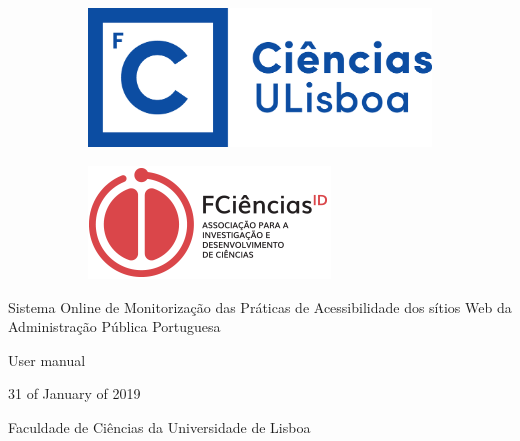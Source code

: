 \pagestyle{empty}

\begin{center}
    \begin{figure}
        \begin{subfigure}{.5\textwidth}
            \centering
            \includegraphics[width=.7\linewidth]{lib/images/logo/fcul_logo.png}
        \end{subfigure}
        \begin{subfigure}{.5\textwidth}
            \centering
            \includegraphics[width=.7\linewidth]{lib/images/logo/FCiencias_ID.png}
        \end{subfigure}
    \end{figure}
    
    \vspace*{3cm}
    
    \Large{Sistema Online de Monitorização das Práticas de Acessibilidade dos sítios Web da Administração Pública Portuguesa}\\
    \vspace{1cm}
    \vfill

    \large{User manual}\\
    \vspace{1.5cm}
    
    \vspace{1.2cm}
    
    \vfill
    31 of January of 2019
    
    \vspace{1.5 cm}
    \vfill
    
    Faculdade de Ciências da Universidade de Lisboa
    
    \vfill
    
\end{center}